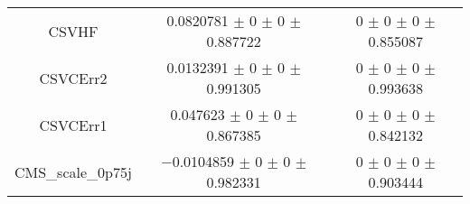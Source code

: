\begin{table}
\begin{tabular}{ccc}
CSVHF & \num{0.0820781} $\pm$ \num{0} $\pm$ \num{0} $\pm$ \num{0.887722} & \num{0} $\pm$ \num{0} $\pm$ \num{0} $\pm$ \num{0.855087}\\
CSVCErr2 & \num{0.0132391} $\pm$ \num{0} $\pm$ \num{0} $\pm$ \num{0.991305} & \num{0} $\pm$ \num{0} $\pm$ \num{0} $\pm$ \num{0.993638}\\
CSVCErr1 & \num{0.047623} $\pm$ \num{0} $\pm$ \num{0} $\pm$ \num{0.867385} & \num{0} $\pm$ \num{0} $\pm$ \num{0} $\pm$ \num{0.842132}\\
CMS\_scale\_0p75j & \num{-0.0104859} $\pm$ \num{0} $\pm$ \num{0} $\pm$ \num{0.982331} & \num{0} $\pm$ \num{0} $\pm$ \num{0} $\pm$ \num{0.903444}\\
\bottomrule
\end{tabular}
\end{table}
